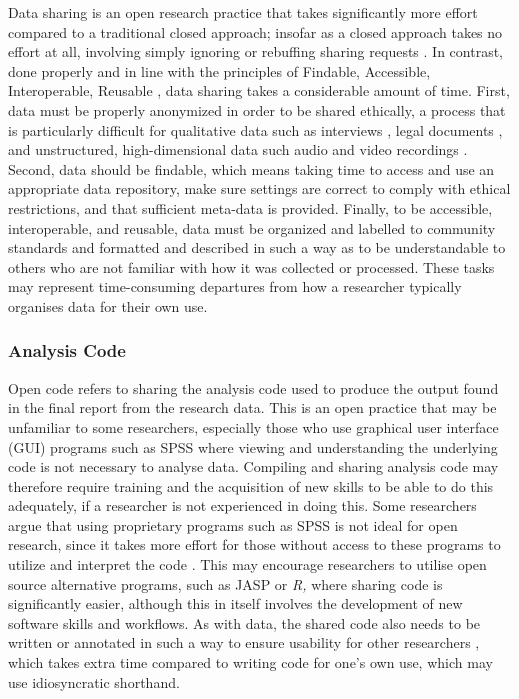 \documentclass[ authordate, meta, issue]{jote-new-article}
\begin{document}
Data sharing is an open research practice that takes significantly more effort compared to a traditional closed approach; insofar as a closed approach takes no effort at all, involving simply ignoring or rebuffing sharing requests \parencites{Gabelica2022}. In contrast, done properly and in line with the principles of Findable, Accessible, Interoperable, Reusable \parencites[FAIR;][]{Wilkinson2016}, data sharing takes a considerable amount of time. First, data must be properly anonymized in order to be shared ethically, a process that is particularly difficult for qualitative data such as interviews \parencites{Saunders2015}, legal documents \parencites{Csányi2021}, and unstructured, high-dimensional data such audio and video recordings \parencites{Weitzenboeck2022}. Second, data should be findable, which means taking time to access and use an appropriate data repository, make sure settings are correct to comply with ethical restrictions, and that sufficient meta-data is provided. Finally, to be accessible, interoperable, and reusable, data must be organized and labelled to community standards and formatted and described in such a way as to be understandable to others who are not familiar with how it was collected or processed. These tasks may represent time-consuming departures from how a researcher typically organises data for their own use.



\subsubsection{Analysis Code}



Open code refers to sharing the analysis code used to produce the output found in the final report from the research data. This is an open practice that may be unfamiliar to some researchers, especially those who use graphical user interface (GUI) programs such as SPSS where viewing and understanding the underlying code is not necessary to analyse data. Compiling and sharing analysis code may therefore require training and the acquisition of new skills to be able to do this adequately, if a researcher is not experienced in doing this. Some researchers argue that using proprietary programs such as SPSS is not ideal for open research, since it takes more effort for those without access to these programs to utilize and interpret the code \parencites{Obels2020}. This may encourage researchers to utilise open source alternative programs, such as JASP or \emph{R, }where sharing code is significantly easier, although this in itself involves the development of new software skills and workflows. As with data, the shared code also needs to be written or annotated in such a way to ensure usability for other researchers \parencites{Obels2020}, which takes extra time compared to writing code for one’s own use, which may use idiosyncratic shorthand.
\end{document}
